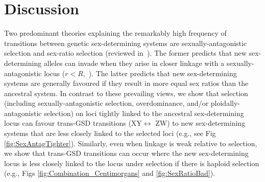 \documentclass[10pt,letterpaper]{article}
\begin{document}
\section*{Discussion}


Two predominant theories explaining the remarkably high frequency of transitions between genetic sex-determining systems are sexually-antagonistic selection and sex-ratio selection (reviewed in~\cite{Blaser2012, vanDoorn2014re}).
The former predicts that new sex-determining alleles can invade when they arise in closer linkage with a sexually-antagonistic locus ($r<R$,~\cite{vanDoorn:2007eu,vanDoorn:2010hu, Muralidhar2018}).
The latter predicts that new sex-determining systems are generally favoured if they result in more equal sex ratios than the ancestral system. 
In contrast to these prevailing views, we show that selection (including sexually-antagonistic selection, overdominance, and/or ploidally-antagonistic selection) on loci tightly linked to the ancestral sex-determining locus can favour trans-GSD transitions (XY$\leftrightarrow$ ZW) to new sex-determining systems that are less closely linked to the selected loci (e.g., see Fig \ref{fig:SexAntagTighter}). 
Similarly, even when linkage is weak relative to selection, we show that %
trans-GSD transitions can occur where the new sex-determining locus is less closely linked to the locus under selection if there is haploid selection (e.g., Figs \ref{fig:Combination_Centimorgans} and \ref{fig:SexRatioBad}). 
\end{document}
